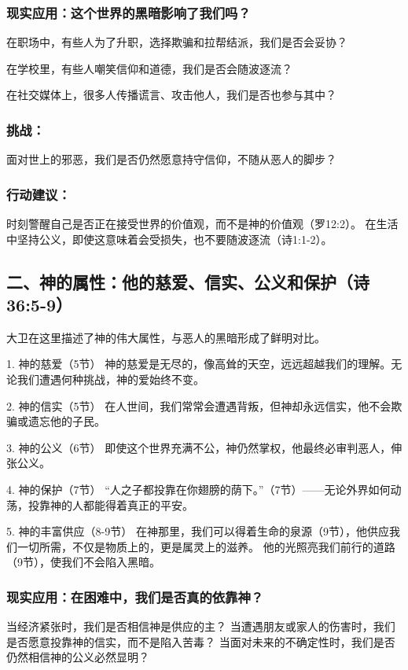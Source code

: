 \documentclass[a4paper, 12pt]{article}
\begin{document}
\subsubsection*{现实应用：这个世界的黑暗影响了我们吗？}
\hspace{0.6cm}在职场中，有些人为了升职，选择欺骗和拉帮结派，我们是否会妥协？

在学校里，有些人嘲笑信仰和道德，我们是否会随波逐流？

在社交媒体上，很多人传播谎言、攻击他人，我们是否也参与其中？
\subsubsection*{挑战：}
面对世上的邪恶，我们是否仍然愿意持守信仰，不随从恶人的脚步？

\subsubsection*{行动建议：}

时刻警醒自己是否正在接受世界的价值观，而不是神的价值观（罗12:2）。
在生活中坚持公义，即使这意味着会受损失，也不要随波逐流（诗1:1-2）。
\subsection*{二、神的属性：他的慈爱、信实、公义和保护（诗36:5-9）}

大卫在这里描述了神的伟大属性，与恶人的黑暗形成了鲜明对比。

1. 神的慈爱（5节）
神的慈爱是无尽的，像高耸的天空，远远超越我们的理解。无论我们遭遇何种挑战，神的爱始终不变。

2. 神的信实（5节）
在人世间，我们常常会遭遇背叛，但神却永远信实，他不会欺骗或遗忘他的子民。

3. 神的公义（6节）
即使这个世界充满不公，神仍然掌权，他最终必审判恶人，伸张公义。

4. 神的保护（7节）
“人之子都投靠在你翅膀的荫下。”（7节）——无论外界如何动荡，投靠神的人都能得着真正的平安。

5. 神的丰富供应（8-9节）
在神那里，我们可以得着生命的泉源（9节），他供应我们一切所需，不仅是物质上的，更是属灵上的滋养。
他的光照亮我们前行的道路（9节），使我们不会陷入黑暗。

\subsubsection*{现实应用：在困难中，我们是否真的依靠神？}
当经济紧张时，我们是否相信神是供应的主？
当遭遇朋友或家人的伤害时，我们是否愿意投靠神的信实，而不是陷入苦毒？
当面对未来的不确定性时，我们是否仍然相信神的公义必然显明？
\end{document}
